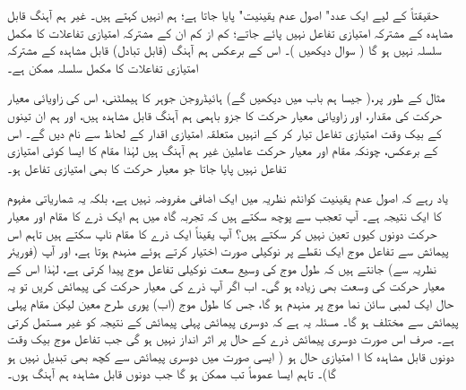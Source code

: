 حقیقتاً      کے لیے ایک عدد"  اصول عدم یقینیت"  پایا جاتا ہے؛ ہم انہیں  کہتے ہیں۔ غیر ہم آہنگ قابل مشاہدہ کے مشترکہ امتیازی تفاعل نہیں پائے جاتے؛  کم از کم ان کے مشترکہ امتیازی تفاعلات  کا مکمل  سلسلہ نہیں ہو گا ( سوال     دیکھیں )۔ اس کے برعکس ہم آہنگ (قابل تبادل)  قابل مشاہدہ  کے  مشترکہ امتیازی تفاعلات کا مکمل سلسلہ ممکن ہے۔


مثال کے طور پر،(  جیسا ہم باب   میں دیکھیں گے)   ہائیڈروجن جوہر کا ہیملٹنی،  اس کی زاویائی معیار حرکت کی مقدار،  اور زاویائی معیار حرکت کا  جزو  باہمی ہم آہنگ قابل مشاہدہ ہیں،  اور ہم ان تینوں کے بیک وقت امتیازی تفاعل تیار کر  کے  انہیں متعلقہ امتیازی اقدار کے لحاظ سے نام دیں گے۔ اس کے برعکس، چونکہ مقام اور معیار حرکت   عاملین غیر ہم آہنگ ہیں لہٰذا  مقام کا ایسا کوئی امتیازی تفاعل نہیں پایا جاتا جو معیار حرکت کا بھی امتیازی تفاعل ہو۔

 یاد رہے کہ اصول  عدم یقینیت   کوانٹم نظریہ میں ایک اضافی مفروضہ نہیں ہے،  بلکہ یہ شماریاتی مفہوم کا ایک نتیجہ ہے۔ آپ تعجب  سے پوچھ سکتے ہیں کہ تجربہ گاہ میں ہم ایک ذرے کا مقام اور معیار حرکت دونوں  کیوں تعین نہیں کر سکتے ہیں؟  آپ یقیناً ایک ذرے کا مقام  ناپ سکتے ہیں تاہم اس   پیمائش سے تفاعل موج ایک نقطے پر نوکیلی صورت اختیار کرتے ہوئے  منہدم  ہوتا  ہے،  اور آپ (فوریئر نظریہ سے)  جانتے ہیں کہ طول موج کی وسیع سعت نوکیلی تفاعل موج پیدا کرتی ہے،  لہٰذا اس کے  معیار حرکت کی وسعت بھی زیادہ ہو گی۔ اب اگر آپ ذرے کی  معیار حرکت کی پیمائش کریں تو  یہ حال  ایک لمبی سائن  نما موج پر منہدم ہو گا،  جس کا  طول موج (اب)   پوری طرح معین  لیکن    مقام پہلی پیمائش سے مختلف ہو گا۔  مسئلہ یہ ہے کہ دوسری پیمائش پہلی پیمائش کے نتیجہ کو  غیر مستمل کرتی ہے۔ صرف اس صورت  دوسری پیمائش ذرے  کے حال پر اثر انداز نہیں ہو گی  جب تفاعل موج بیک وقت دونوں قابل مشاہدہ  کا ا امتیازی حال ہو ( ایسی صورت میں دوسری پیمائش سے کچھ بھی تبدیل نہیں ہو گا)۔ تاہم  ایسا عموماً تب ممکن ہو گا جب  دونوں قابل مشاہدہ ہم آہنگ ہوں۔
 
